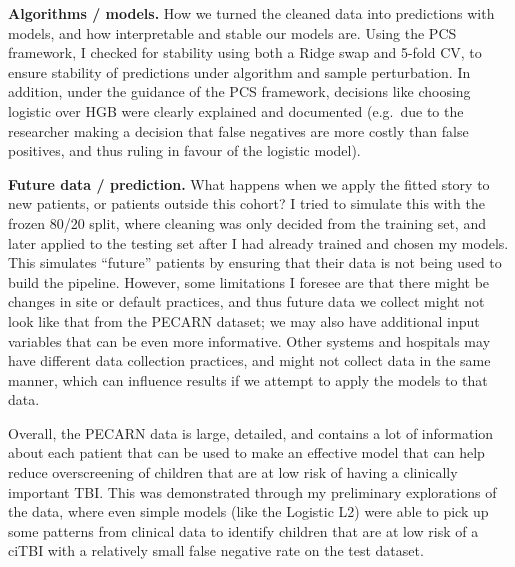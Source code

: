 \documentclass[10pt,letterpaper]{article}
\begin{document}
\textbf{Algorithms / models.}
How we turned the cleaned data into predictions with models, and how interpretable and stable our models are.
Using the PCS framework, I checked for stability using both a Ridge swap and 5-fold CV, to ensure stability of predictions under algorithm and sample perturbation.
In addition, under the guidance of the PCS framework, decisions like choosing logistic over HGB were clearly explained and documented (e.g.\ due to the researcher making a decision that false negatives are more costly than false positives, and thus ruling in favour of the logistic model).

\textbf{Future data / prediction.}
What happens when we apply the fitted story to new patients, or patients outside this cohort?
I tried to simulate this with the frozen 80/20 split, where cleaning was only decided from the training set, and later applied to the testing set after I had already trained and chosen my models.
This simulates ``future'' patients by ensuring that their data is not being used to build the pipeline.
However, some limitations I foresee are that there might be changes in site or default practices, and thus future data we collect might not look like that from the PECARN dataset; we may also have additional input variables that can be even more informative.
Other systems and hospitals may have different data collection practices, and might not collect data in the same manner, which can influence results if we attempt to apply the models to that data.

Overall, the PECARN data is large, detailed, and contains a lot of information about each patient that can be used to make an effective model that can help reduce overscreening of children that are at low risk of having a clinically important TBI.
This was demonstrated through my preliminary explorations of the data, where even simple models (like the Logistic L2) were able to pick up some patterns from clinical data to identify children that are at low risk of a ciTBI with a relatively small false negative rate on the test dataset.


\end{document}
